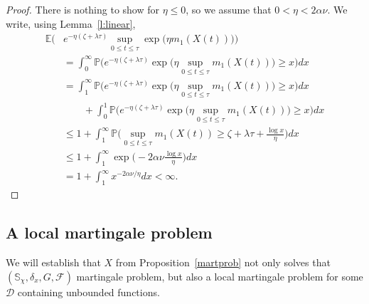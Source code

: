 \documentclass{imsart}
\theoremstyle{plain}
\theoremstyle{definition}
\begin{document}
\begin{proof}
    There is nothing to show for $\eta \leq 0$, so we assume that $0 < \eta < 2\alpha \nu$. We write, using Lemma~\ref{l:linear},
\begin{align*}
    \mathbb E\Big(&e^{- \eta(\zeta + \lambda\tau)} \sup_{0 \leq t\leq \tau} \exp\Big(\eta  m_1(X(t))\Big) \Big) \\ & = \int_0^\infty \mathbb P\Big(e^{- \eta(\zeta + \lambda\tau)}\exp\Big(\eta  \sup_{0 \leq t\leq \tau} m_1(X(t))\Big) \geq x \Big) dx \\ 
     & = \int_1^\infty \mathbb P\Big(e^{- \eta(\zeta + \lambda\tau)}\exp\Big(\eta  \sup_{0 \leq t\leq \tau} m_1(X(t))\Big) \geq x \Big) dx \\ 
     &\quad \quad +\int_0^1 \mathbb P\Big(e^{- \eta(\zeta + \lambda\tau)}\exp\Big(\eta  \sup_{0 \leq t\leq \tau} m_1(X(t))\Big) \geq x \Big) dx\\
     & \leq 1 + \int_1^\infty \mathbb P\big( \sup_{0 \leq t\leq \tau} m_1(X(t)) \geq \zeta + \lambda \tau + \tfrac{\log x}{\eta} \big) dx \\ 
     & \leq 1 + \int_1^\infty \exp\big( - 2\alpha \nu \tfrac{\log x}{\eta} \big)dx\\
     &= 1+ \int_1^\infty x^{-2\alpha \nu / \eta} dx < \infty. 
\end{align*}
\end{proof}

\subsection{A local martingale problem}
\label{S:locMartProb}
We will establish that $X$ from Proposition~\ref{martprob} not only solves that $(\mathbb S_{\chi}, \delta_x, G, \mathcal F)$ martingale problem, but also a local martingale problem for some $\mathcal D$ containing unbounded functions. 
\end{document}
